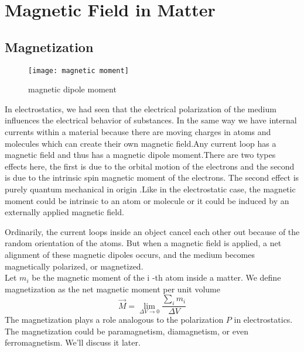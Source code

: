 \chapter{Magnetic Field in Matter}
\section{Magnetization}
\begin{wrapfigure}{r}{0.3\textwidth}
	\begin{center}
		\texttt{[image: magnetic moment]}
	\end{center}
	\caption{magnetic dipole moment}
\end{wrapfigure}

In  electrostatics, we had seen that the electrical polarization of the medium  influences the electrical behavior of substances. In the same way we have internal currents within a material because there are moving charges in atoms and molecules which can create their own magnetic field.Any current loop has a magnetic field and thus has a magnetic dipole moment.There are two types effects here, the first is due to the orbital motion of the electrons and the second is due to the intrinsic spin magnetic moment of the electrons. The second effect is purely quantum mechanical in origin .Like in the electrostatic case, the magnetic moment could be intrinsic to an atom or molecule or it could be induced by an externally applied magnetic field. \par
Ordinarily, the current loops inside an object cancel each other out because of the random orientation of the atoms. But when a magnetic field is applied, a net alignment of these magnetic dipoles occurs, and the medium becomes magnetically polarized, or magnetized.
\\
Let ${m_{i}}$ be the magnetic moment of the $\mathrm{i}$ -th atom inside a matter. We define magnetization as the net magnetic moment per unit volume
$$
\vec{M}=\lim _{\Delta V \rightarrow 0} \frac{\sum_{i} {m_{i}}}{\Delta V}
$$
The magnetization  plays a role analogous to the polarization ${P}$ in electrostatics.  The magnetization  could be paramagnetism, diamagnetism, or even ferromagnetism. We'll discuss it later.
